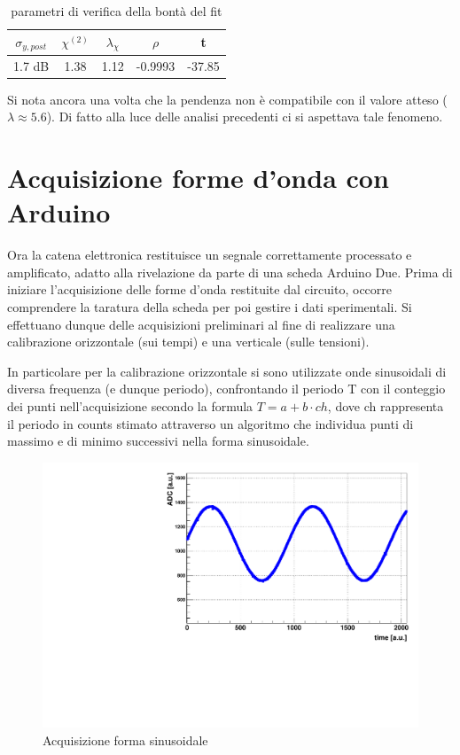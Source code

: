 \documentclass{article}
\begin{document}
\begin{table}[ht]
    \centering
    \begin{tabular}{ccccc}
        \toprule
        $\sigma_{y, post}$    &$\chi^{(2)}$    &$\lambda_{\chi}$   &$\rho$  &t   \\
        \midrule
        1.7 dB                &1.38           &1.12              &-0.9993&-37.85\\
        \bottomrule
    \end{tabular}
    \caption{parametri di verifica della bontà del fit}
\end{table}

Si nota ancora una volta che la pendenza non è compatibile con il valore atteso ($\lambda \approx 5.6$).
Di fatto alla luce delle analisi precedenti ci si aspettava tale fenomeno.

\section{Acquisizione forme d'onda con Arduino}

Ora la catena elettronica restituisce un segnale correttamente processato e amplificato, adatto alla rivelazione da parte di una scheda Arduino Due. Prima di iniziare
l'acquisizione delle forme d'onda restituite dal circuito, occorre comprendere la taratura della scheda per poi gestire i dati sperimentali. Si effettuano dunque delle 
acquisizioni preliminari al fine di realizzare una calibrazione orizzontale (sui tempi) e una verticale (sulle tensioni).

In particolare per la calibrazione orizzontale si sono utilizzate onde sinusoidali di diversa frequenza (e dunque periodo), confrontando
il periodo T con il conteggio dei punti nell'acquisizione secondo la formula $T = a + b \cdot ch$, dove ch rappresenta il periodo in 
counts stimato attraverso un algoritmo che individua punti di massimo e di minimo successivi nella forma sinusoidale.

\begin{center}
\begin{figure}[H]
\centering
\includegraphics[scale=0.4, angle=0]{4_1.pdf}
\caption{Acquisizione forma sinusoidale}
\label{fig:period_counts}
\end{figure}
\end{center}
\end{document}
